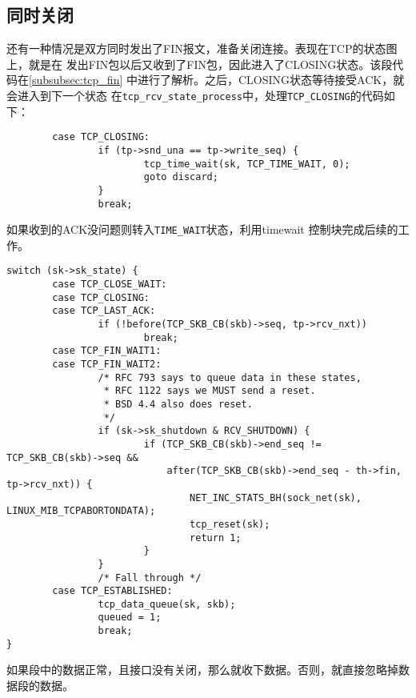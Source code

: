	\subsection{同时关闭}
		\label{subsec:fin_at_same_time}
			还有一种情况是双方同时发出了FIN报文，准备关闭连接。表现在TCP的状态图上，就是在
			发出FIN包以后又收到了FIN包，因此进入了CLOSING状态。该段代码在\ref{subsubsec:tcp_fin}
			中进行了解析。之后，CLOSING状态等待接受ACK，就会进入到下一个状态
			在\texttt{tcp_rcv_state_process}中，处理\texttt{TCP_CLOSING}的代码如下：
\begin{verbatim}
        case TCP_CLOSING:
                if (tp->snd_una == tp->write_seq) {
                        tcp_time_wait(sk, TCP_TIME_WAIT, 0);
                        goto discard;
                }
                break;
\end{verbatim}
	如果收到的ACK没问题则转入\texttt{TIME_WAIT}状态，利用timewait
	控制块完成后续的工作。
\begin{verbatim}
switch (sk->sk_state) {
        case TCP_CLOSE_WAIT:
        case TCP_CLOSING:
        case TCP_LAST_ACK:
                if (!before(TCP_SKB_CB(skb)->seq, tp->rcv_nxt))
                        break;
        case TCP_FIN_WAIT1:
        case TCP_FIN_WAIT2:
                /* RFC 793 says to queue data in these states,
                 * RFC 1122 says we MUST send a reset.
                 * BSD 4.4 also does reset.
                 */
                if (sk->sk_shutdown & RCV_SHUTDOWN) {
                        if (TCP_SKB_CB(skb)->end_seq != TCP_SKB_CB(skb)->seq &&
                            after(TCP_SKB_CB(skb)->end_seq - th->fin, tp->rcv_nxt)) {
                                NET_INC_STATS_BH(sock_net(sk), LINUX_MIB_TCPABORTONDATA);
                                tcp_reset(sk);
                                return 1;
                        }
                }
                /* Fall through */
        case TCP_ESTABLISHED:
                tcp_data_queue(sk, skb);
                queued = 1;
                break;
}
\end{verbatim}
如果段中的数据正常，且接口没有关闭，那么就收下数据。否则，就直接忽略掉数据段的数据。

